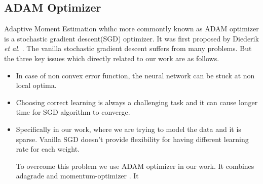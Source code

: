\subsection{ADAM Optimizer}

Adaptive Moment Estimation whihc more commontly known as ADAM optimizer is a stochastic gradient descent(SGD) optimizer. It was first proposed by Diederik \textit{et al.} \cite{Adam}. The vanilla stochastic gradient descent suffers from many problems. But the three key issues which directly related to our work are as follows.
\begin{itemize}
    \item In case of non convex error function, the neural network can be stuck at non local optima.
    \item Choosing correct learning is always a challenging task and it can cause longer time for SGD algorithm to converge.
    \item Specifically in our work, where we are trying to model the data and it is sparse. Vanilla SGD doesn't provide flexibility for having different learning rate for each weight.

To overcome this problem we use ADAM optimizer in our work. It combines adagrade\cite{Adagrade} and momentum-optimizer \cite{momentum}. It 

\end{itemize}
 
 
 